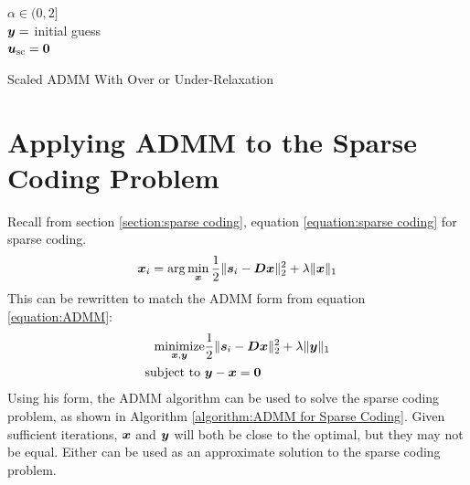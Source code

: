 \begin{algorithm}[H] \label{algorithm:Scaled ADMM with Relaxation}
\SetAlgoLined
   $\alpha \in (0,2]$ \\
   $\bm{y} = $ initial guess \\
   $\bm{u}_{\text{sc}} = \bm{0}$ \\
 \caption{Scaled ADMM With Over or Under-Relaxation}
\end{algorithm}


\section{Applying ADMM to the Sparse Coding Problem}
\label{section:Applying ADMM}
Recall from section \ref{section:sparse coding}, equation \ref{equation:sparse coding} for sparse coding.
%
\begin{equation}
\bm{x}_i = \arg\min_{\bm{x}} \frac{1}{2}\|\bm{s}_i - \bm{D}\bm{x}\|_2^2 + \lambda \|\bm{x}\|_1
\end{equation}
%
This can be rewritten to match the ADMM form from equation \ref{equation:ADMM}:
\begin{equation} \label{equation:SC Opt Prob}
\begin{aligned}
\operatorname*{\text{minimize}}_{\bm{x},\bm{y}} & \frac{1}{2} \|\bm{s}_i - \bm{D}\bm{x}\|_2^2 + \lambda\|\bm{y}\|_1 \\
         \text{subject to } & \bm{y} - \bm{x} = \bm{0}
\end{aligned}
\end{equation}
%
Using his form, the ADMM algorithm can be used to solve the sparse coding problem, as shown in Algorithm \ref{algorithm:ADMM for Sparse Coding}. Given sufficient iterations, $\bm{x}$ and $\bm{y}$ will both be close to the optimal, but they may not be equal. Either can be used as an approximate solution to the sparse coding problem.

